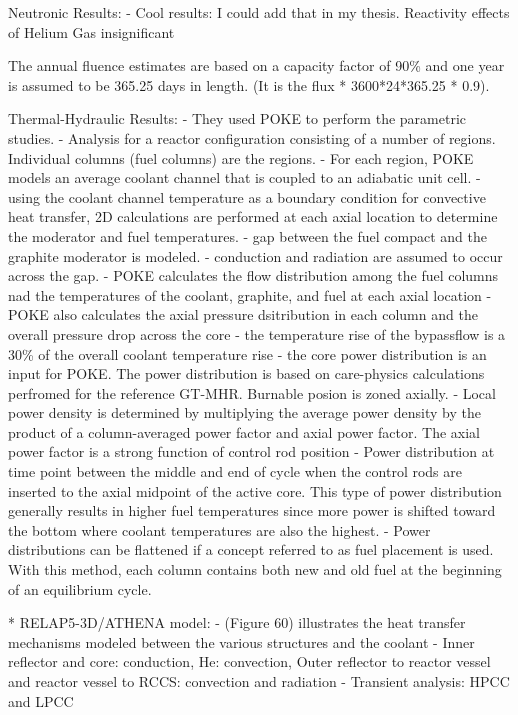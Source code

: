 Neutronic Results:
- Cool results: I could add that in my thesis.
Reactivity effects of Helium Gas insignificant

The annual fluence estimates are based on a capacity factor of 90\% and one year is assumed to be 365.25 days in length. (It is the flux * 3600*24*365.25 * 0.9).

Thermal-Hydraulic Results:
- They used POKE to perform the parametric studies.
- Analysis for a reactor configuration consisting of a number of regions. Individual columns (fuel columns) are the regions.
- For each region, POKE models an average coolant channel that is coupled to an adiabatic unit cell.
- using the coolant channel temperature as a boundary condition for convective heat transfer, 2D calculations are performed at each axial location to determine the moderator and fuel temperatures.
- gap between the fuel compact and the graphite moderator is modeled.
- conduction and radiation are assumed to occur across the gap.
- POKE calculates the flow distribution among the fuel columns nad the temperatures of the coolant, graphite, and fuel at each axial location
- POKE also calculates the axial pressure dsitribution in each column and the overall pressure drop across the core
- the temperature rise of the bypassflow is a 30\% of the overall coolant temperature rise
- the core power distribution is an input for POKE. The power distribution is based on care-physics calculations perfromed for the reference GT-MHR.
Burnable posion is zoned axially.
- Local power density is determined by multiplying the average power density by the product of a column-averaged power factor and axial power factor.
The axial power factor is a strong function of control rod position
- Power distribution at time point between the middle and end of cycle when the control rods are inserted to the axial midpoint of the active core.
This type of power distribution generally results in higher fuel temperatures since more power is shifted toward the bottom where coolant temperatures are also the highest.
- Power distributions can be flattened if a concept referred to as fuel placement is used. With this method, each column contains both new and old fuel at the beginning of an equilibrium cycle.

* RELAP5-3D/ATHENA model:
	- (Figure 60) illustrates the heat transfer mechanisms modeled between the various structures and the coolant
	- Inner reflector and core: conduction, He: convection, Outer reflector to reactor vessel and reactor vessel to RCCS: convection and radiation
	- Transient analysis: HPCC and LPCC

